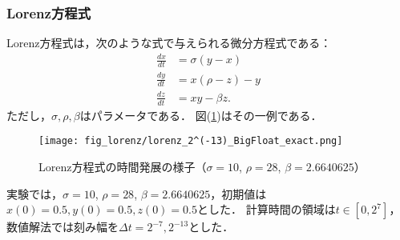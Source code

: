 \subsubsection{Lorenz方程式}
Lorenz方程式は，次のような式で与えられる微分方程式である：
\begin{align}
    \frac{dx}{dt} &= \sigma(y-x) \\
    \frac{dy}{dt} &= x(\rho-z)-y \\
    \frac{dz}{dt} &= xy - \beta z.
\end{align}
ただし，$\sigma,\rho,\beta$はパラメータである．
図(\ref{fig:lorenz})はその一例である．
\begin{figure}[H]
    \centering
    \texttt{[image: fig\_lorenz/lorenz\_2^(-13)\_BigFloat\_exact.png]}
    \caption{Lorenz方程式の時間発展の様子（$\sigma=10$, $\rho=28$, $\beta=2.6640625$）}
    \label{fig:lorenz}
\end{figure}
実験では，$\sigma=10$, $\rho=28$, $\beta=2.6640625$，初期値は$x(0) = 0.5, y(0) = 0.5, z(0) = 0.5$とした．
計算時間の領域は$t \in [0,2^7]$，数値解法では刻み幅を$\Delta t =  2^{-7}, 2^{-13}$とした．
